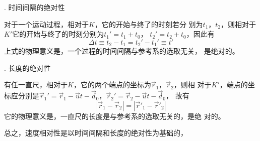 . 时间间隔的绝对性 \normalfont

对于一个运动过程，相对于$K$，它的开始与终了的时刻若分
别为$t_1$，$t_2$，则相对于$K'$它的开始与终了的时刻分别为$t_1'=t_1+t_0$，
$t_2'=t_2+t_0$，因此有
\begin{equation}\label{eqn:02.05.05}
    \Delta t \equiv t_2 - t_1 = t_2' - t_1' \equiv t'
\end{equation}
上式的物理意义是，一个过程的时间间隔与参考系的选取无关，
是绝对的。

. 长度的绝对性 \normalfont

有任一直尺，相对于$K$，它的两个端点的坐标为$\vec{r}_1$，$\vec{r}_2$，则相
对于$K'$，端点的坐标应分别是$\vec{r}_1' = \vec{r}_1 - \vec{u} t - \vec{d}_0$，$\vec{r}_2' = \vec{r}_2 - \vec{u} t - \vec{d}_0$，
故有
\begin{equation}\label{eqn:02.05.06}
    |\vec{r}_1 - \vec{r}_2| = |\vec{r}'_1 - \vec{r}'_2|
\end{equation}
它的物理意义是，一直尺的长度是与参考系的选取无关的，是绝
对的。

总之，速度相对性是以时间间隔和长度的绝对性为基础的，
